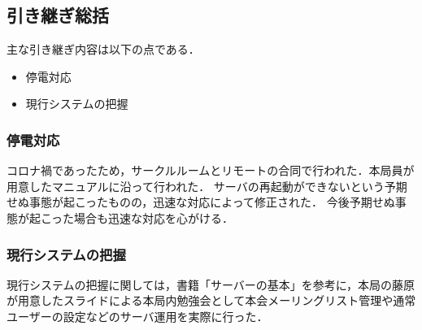 \subsection*{引き継ぎ総括}

主な引き継ぎ内容は以下の点である．
\begin{itemize}
	\item 停電対応
	\item 現行システムの把握
\end{itemize}

\subsubsection*{停電対応}
コロナ禍であったため，サークルルームとリモートの合同で行われた．本局員が用意したマニュアルに沿って行われた．
サーバの再起動ができないという予期せぬ事態が起こったものの，迅速な対応によって修正された．
今後予期せぬ事態が起こった場合も迅速な対応を心がける．

\subsubsection*{現行システムの把握}
現行システムの把握に関しては，書籍「サーバーの基本」を参考に，本局の藤原が用意したスライドによる本局内勉強会として本会メーリングリスト管理や通常ユーザーの設定などのサーバ運用を実際に行った．

